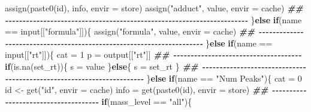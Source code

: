 \documentclass[
]{article}
\newenvironment{Shaded}{\begin{snugshade}}{\end{snugshade}}
\newcommand{\AttributeTok}[1]{\textcolor[rgb]{0.77,0.63,0.00}{#1}}
\newcommand{\ControlFlowTok}[1]{\textcolor[rgb]{0.13,0.29,0.53}{\textbf{#1}}}
\newcommand{\DecValTok}[1]{\textcolor[rgb]{0.00,0.00,0.81}{#1}}
\newcommand{\DocumentationTok}[1]{\textcolor[rgb]{0.56,0.35,0.01}{\textbf{\textit{#1}}}}
\newcommand{\FunctionTok}[1]{\textcolor[rgb]{0.00,0.00,0.00}{#1}}
\newcommand{\NormalTok}[1]{#1}
\newcommand{\OtherTok}[1]{\textcolor[rgb]{0.56,0.35,0.01}{#1}}
\newcommand{\SpecialCharTok}[1]{\textcolor[rgb]{0.00,0.00,0.00}{#1}}
\newcommand{\StringTok}[1]{\textcolor[rgb]{0.31,0.60,0.02}{#1}}
\begin{document}
\begin{Shaded}
\begin{Highlighting}[]
      \FunctionTok{assign}\NormalTok{(}\FunctionTok{paste0}\NormalTok{(id), info, }\AttributeTok{envir =}\NormalTok{ store)}
      \FunctionTok{assign}\NormalTok{(}\StringTok{"adduct"}\NormalTok{, value, }\AttributeTok{envir =}\NormalTok{ cache)}
      \DocumentationTok{\#\# {-}{-}{-}{-}{-}{-}{-}{-}{-}{-}{-}{-}{-}{-}{-}{-}{-}{-}{-}{-}{-}{-}{-}{-}{-}{-}{-}{-}{-}{-}{-}{-}{-}{-}{-}{-}{-}{-}{-}{-}{-}{-}{-}{-}{-}{-}{-}{-}{-}{-}{-}{-}{-}{-}{-}{-}{-}{-}{-}{-}{-}{-}{-}{-}{-}{-}{-}{-}{-}{-} }
\NormalTok{    \}}\ControlFlowTok{else} \ControlFlowTok{if}\NormalTok{(name }\SpecialCharTok{==}\NormalTok{ input[[}\StringTok{"formula"}\NormalTok{]])\{}
      \FunctionTok{assign}\NormalTok{(}\StringTok{"formula"}\NormalTok{, value, }\AttributeTok{envir =}\NormalTok{ cache)}
      \DocumentationTok{\#\# {-}{-}{-}{-}{-}{-}{-}{-}{-}{-}{-}{-}{-}{-}{-}{-}{-}{-}{-}{-}{-}{-}{-}{-}{-}{-}{-}{-}{-}{-}{-}{-}{-}{-}{-}{-}{-}{-}{-}{-}{-}{-}{-}{-}{-}{-}{-}{-}{-}{-}{-}{-}{-}{-}{-}{-}{-}{-}{-}{-}{-}{-}{-}{-}{-}{-}{-}{-}{-}{-} }
\NormalTok{    \}}\ControlFlowTok{else} \ControlFlowTok{if}\NormalTok{(name }\SpecialCharTok{==}\NormalTok{ input[[}\StringTok{"rt"}\NormalTok{]])\{}
\NormalTok{      cat }\OtherTok{=} \DecValTok{1}
\NormalTok{      p }\OtherTok{=}\NormalTok{ output[[}\StringTok{"rt"}\NormalTok{]]}
      \DocumentationTok{\#\# {-}{-}{-}{-}{-}{-}{-}{-}{-}{-}{-}{-}{-}{-}{-}{-}{-}{-}{-}{-}{-}{-}{-}{-}{-}{-}{-}{-}{-}{-}{-}{-}{-}{-}{-}{-}{-} }
      \ControlFlowTok{if}\NormalTok{(}\FunctionTok{is.na}\NormalTok{(set\_rt))\{}
\NormalTok{        s }\OtherTok{=}\NormalTok{ value}
\NormalTok{      \}}\ControlFlowTok{else}\NormalTok{\{}
\NormalTok{        s }\OtherTok{=}\NormalTok{ set\_rt}
\NormalTok{      \}}
      \DocumentationTok{\#\# {-}{-}{-}{-}{-}{-}{-}{-}{-}{-}{-}{-}{-}{-}{-}{-}{-}{-}{-}{-}{-}{-}{-}{-}{-}{-}{-}{-}{-}{-}{-}{-}{-}{-}{-}{-}{-}{-}{-}{-}{-}{-}{-}{-}{-}{-}{-}{-}{-}{-}{-}{-}{-}{-}{-}{-}{-}{-}{-}{-}{-}{-}{-}{-}{-}{-}{-}{-}{-}{-} }
\NormalTok{    \}}\ControlFlowTok{else} \ControlFlowTok{if}\NormalTok{(name }\SpecialCharTok{==} \StringTok{"Num Peaks"}\NormalTok{)\{}
\NormalTok{      cat }\OtherTok{=} \DecValTok{0}
\NormalTok{      id }\OtherTok{\textless{}{-}} \FunctionTok{get}\NormalTok{(}\StringTok{"id"}\NormalTok{, }\AttributeTok{envir =}\NormalTok{ cache)}
\NormalTok{      info }\OtherTok{=} \FunctionTok{get}\NormalTok{(}\FunctionTok{paste0}\NormalTok{(id), }\AttributeTok{envir =}\NormalTok{ store)}
      \DocumentationTok{\#\# {-}{-}{-}{-}{-}{-}{-}{-}{-}{-}{-}{-}{-}{-}{-}{-}{-}{-}{-}{-}{-}{-}{-}{-}{-}{-}{-}{-}{-}{-}{-}{-}{-}{-}{-}{-}{-} }
      \ControlFlowTok{if}\NormalTok{(mass\_level }\SpecialCharTok{==} \StringTok{"all"}\NormalTok{)\{}

\end{Highlighting}
\end{Shaded}
\end{document}

